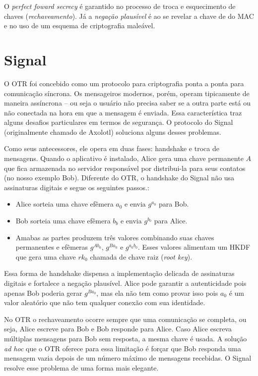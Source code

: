 O {\em perfect foward secrecy} é garantido no processo de troca e esquecimento de chaves ({\em rechaveamento}).
Já a {\em negação plausível} é ao se revelar a chave de do MAC e no uso de um esquema de criptografia maleável.


\section{Signal}
\label{sec:signal}

O OTR foi concebido como um protocolo para criptografia ponta a ponta para comunicação síncrona.
Os mensageiros modernos, porém, operam tipicamente de maneira assíncrona -- ou seja o usuário não precisa saber se a outra parte está ou não conectada na hora em que a mensagem é enviada.
Essa característica traz alguns desafios particulares em termos de segurança.
O protocolo do Signal (originalmente chamado de Axolotl) soluciona alguns desses problemas.

Como seus antecessores, ele opera em duas fases: handshake e troca de mensagens.
Quando o aplicativo é instalado, Alice gera uma chave permanente $A$ que fica armazenada no servidor responsável por distribui-la para seus contatos (no nosso exemplo Bob).
Diferente do OTR, o handshake do Signal não usa assinaturas digitais e segue os seguintes passos.:
\begin{itemize}
\item Alice sorteia uma chave efêmera $a_0$ e envia $g^{a_0}$ para Bob.
\item Bob sorteia uma chave efêmera $b_b$ e envia $g^{b_0}$ para Alice.
\item Amabas as partes produzem três valores combinando suas chaves permanentes e efêmeras $g^{Ab_0}$, $g^{Ba_0}$ e $g^{a_0b_0}$.
  Esses valores alimentam um HKDF que gera uma chave $rk_0$ chamada de chave raiz ({\em root key}).
\end{itemize}

Essa forma de handshake dispensa a implementação delicada de assinaturas digitais e fortalece a negação plausível.
Alice pode garantir a autenticidade pois apenas Bob poderia gerar $g^{Ba_0}$, mas ela não tem como provar isso pois $a_0$ é um valor aleatório que não tem qualquer conexão com sua identidade.

No OTR o rechaveamento ocorre sempre que uma comunicação se completa, ou seja, Alice escreve para Bob e Bob responde para Alice.
Caso Alice escreva múltiplas mensagens para Bob sem resposta, a mesma chave é usada.
A solução {\em ad hoc} que o OTR oferece para essa limitação é forçar que Bob responda uma mensagem vazia depois de um número máximo de mensagens recebidas.
O Signal resolve esse problema de uma forma mais elegante.


